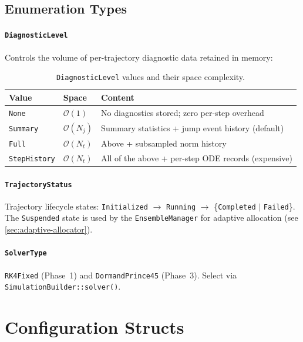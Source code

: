 \documentclass[11pt,a4paper,twoside]{book}
\newcommand{\Order}{\mathcal{O}}
\newcommand{\code}[1]{\texttt{\small#1}}
\theoremstyle{definition}
\theoremstyle{remark}
\begin{document}
\subsection{Enumeration Types}
\label{subsec:enums}

\paragraph{\code{DiagnosticLevel}} Controls the volume of per-trajectory
diagnostic data retained in memory:

\begin{table}[H]
\centering
\caption{\code{DiagnosticLevel} values and their space complexity.}
\label{tab:diag-levels}
\begin{tabularx}{\linewidth}{L{32mm}L{20mm}X}
\toprule
\textbf{Value} & \textbf{Space} & \textbf{Content} \\
\midrule
\code{None}        & $\Order(1)$     & No diagnostics stored; zero per-step overhead \\
\code{Summary}     & $\Order(N_j)$   & Summary statistics + jump event history (default) \\
\code{Full}        & $\Order(N_t)$   & Above + subsampled norm history \\
\code{StepHistory} & $\Order(N_t)$   & All of the above + per-step ODE records (expensive) \\
\bottomrule
\end{tabularx}
\end{table}

\paragraph{\code{TrajectoryStatus}} Trajectory lifecycle states:
\code{Initialized} $\to$ \code{Running} $\to$ \{\code{Completed} $|$ \code{Failed}\}.
The \code{Suspended} state is used by the \code{EnsembleManager} for
adaptive allocation (see \cref{sec:adaptive-allocator}).

\paragraph{\code{SolverType}} \code{RK4Fixed} (Phase~1) and
\code{DormandPrince45} (Phase~3). Select via \code{SimulationBuilder::solver()}.

\section{Configuration Structs}
\label{sec:config}
\end{document}
